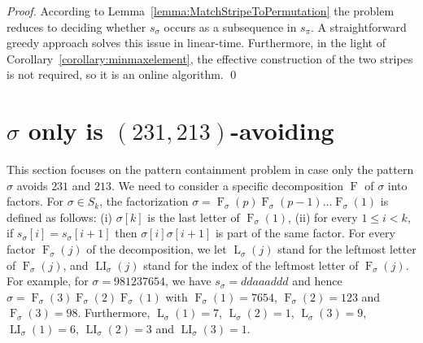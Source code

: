 \documentclass[a4paper]{llncs}
\DeclareMathOperator{\AV}{Av}
\newcommand{\pmotif}{\sigma}
\DeclareMathOperator{\firsta}{L}
\newcommand{\first}[2]{\firsta_{{#1}}({#2})}
\DeclareMathOperator{\firstia}{LI}
\newcommand{\firsti}[2]{\firstia_{{#1}}({#2})}
\DeclareMathOperator{\factora}{F}
\newcommand{\factor}[2]{\factora_{{#1}}({#2})}
\begin{document}
\begin{proof}
According to Lemma~\ref{lemma:MatchStripeToPermutation} the problem reduces
to deciding whether $s_\sigma$ occurs as a subsequence in $s_\pi$.
A straightforward greedy approach solves this issue in linear-time.
Furthermore, in the light of Corollary~\ref{corollary:minmaxelement},
the effective construction of the two stripes is not required,
so it is an online algorithm.
\qed
\end{proof}


\section{$\sigma$ only is $(231,213)$-avoiding}
\label{section:sigma only avoid 231 and 213}

This section focuses on the pattern containment problem
in case only the pattern $\sigma$ avoids $231$ and $213$.
We need to consider a specific decomposition $\factora$ of $\sigma$ into factors.
For $\sigma \in S_k$, the factorization
$\sigma = \factor{\pmotif}{p} \factor{\pmotif}{p-1} \ldots \factor{\pmotif}{1}$ is defined as follows:
(i) $\sigma[k]$ is the last letter of $\factor{\pmotif}{1}$,
(ii) for every $1 \leq i < k$,
if $s_\sigma[i] = s_\sigma[i+1]$ then
$\sigma[i]\sigma[i+1]$ is part of the same factor.
For every factor $\factor{\pmotif}{j}$ of the decomposition, we let
$\first{\pmotif}{j}$ stand for the leftmost letter of $\factor{\pmotif}{j}$,
and $\firsti{\pmotif}{j}$ stand for the index of the leftmost letter of $\factor{\pmotif}{j}$.
For example,
for $\sigma = 981237654$,
we have
$s_\sigma = ddaaaddd$ and hence
$\sigma = \factor{\pmotif}{3} \factor{\pmotif}{2} \factor{\pmotif}{1}$ with
$\factor{\pmotif}{1} =7654$, $\factor{\pmotif}{2} = 123$ and $\factor{\pmotif}{3} = 98$.
Furthermore,
$\first{\pmotif}{1} = 7$, $\first{\pmotif}{2} = 1$, $\first{\pmotif}{3} = 9$,
$\firsti{\pmotif}{1} = 6$, $\firsti{\pmotif}{2} = 3$ and $\firsti{\pmotif}{3} = 1$.
\end{document}
